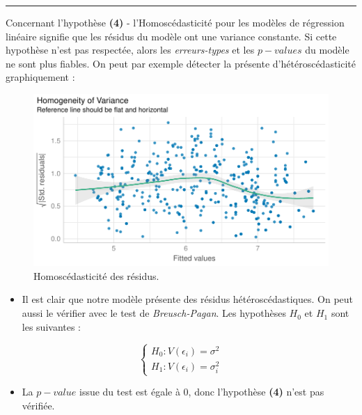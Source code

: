 \documentclass[
  12pt,
]{report}
\providecommand{\tightlist}{%
  \setlength{\itemsep}{0pt}\setlength{\parskip}{0pt}}\usepackage{longtable,booktabs,array}
\begin{document}
\begin{center}\rule{0.5\linewidth}{0.5pt}\end{center}

Concernant l'hypothèse \textbf{(4)} - l'Homoscédasticité pour les
modèles de régression linéaire signifie que les résidus du modèle ont
une variance constante. Si cette hypothèse n'est pas respectée, alors
les \emph{erreurs-types} et les \(p-values\) du modèle ne sont plus
fiables. On peut par exemple détecter la présente d'hétéroscédasticité
graphiquement :

\begin{figure}[H]

{\centering \includegraphics{report_files/figure-pdf/heteroscedasticity-1.pdf}

}

\caption{Homoscédasticité des résidus.}

\end{figure}%

\begin{itemize}
\tightlist
\item
  Il est clair que notre modèle présente des résidus hétéroscédastiques.
  On peut aussi le vérifier avec le test de \emph{Breusch-Pagan}. Les
  hypothèses \(H_0\) et \(H_1\) sont les suivantes :
\end{itemize}

\[
\begin{cases}
H_0 : V(\epsilon_i) = \sigma^2\\
H_1 : V(\epsilon_i) = \sigma^2_i
\end{cases}
\]

\vspace{1em}

\begin{itemize}
\tightlist
\item
  La \(p-value\) issue du test est égale à 0, donc l'hypothèse
  \textbf{(4)} n'est pas vérifiée.
\end{itemize}
\end{document}
